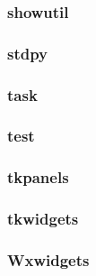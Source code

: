 \documentclass[a4paper]{article}
\begin{document}
\clearpage\subsubsection[showutil]{showutil}
\hypertarget{RefHeading18371167907073}{}\subsubsection{}
\clearpage\subsubsection[stdpy]{stdpy}
\hypertarget{RefHeading18391167907073}{}\subsubsection{}
\clearpage\subsubsection[task]{task}
\hypertarget{RefHeading18411167907073}{}\subsubsection{}
\clearpage\subsubsection[test]{test}
\hypertarget{RefHeading18431167907073}{}\subsubsection{}
\clearpage\subsubsection[tkpanels]{tkpanels}
\hypertarget{RefHeading18451167907073}{}\subsubsection{}
\clearpage\subsubsection[tkwidgets]{tkwidgets}
\hypertarget{RefHeading18471167907073}{}\subsubsection{}
\clearpage\subsubsection[Wxwidgets]{Wxwidgets}
\hypertarget{RefHeading18491167907073}{}
\bigskip
\end{document}
